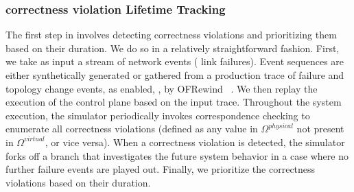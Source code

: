 {{\subsubsection{correctness violation Lifetime Tracking} The first step in
\simulator{} involves detecting correctness violations and prioritizing them based
on their duration.
We do so in a relatively straightforward fashion. First, we take as input
a stream of network events (\eg{} link failures). Event sequences are either
synthetically generated or gathered from a production trace of failure and topology change
events, as enabled, \eg{}, by OFRewind~\cite{ofrewind} .
We then replay the execution of the
control plane based on the input trace. Throughout the system execution,
the simulator periodically invokes correspondence checking to enumerate all
correctness violations (defined as any value in $\Omega^{physical}$ not present in
$\Omega^{virtual}$, or vice versa). When a correctness violation is detected,
the simulator forks off a branch that investigates the future system behavior
in a case where no further failure events are played out. Finally, we
prioritize the correctness violations based on their duration.
}



}
